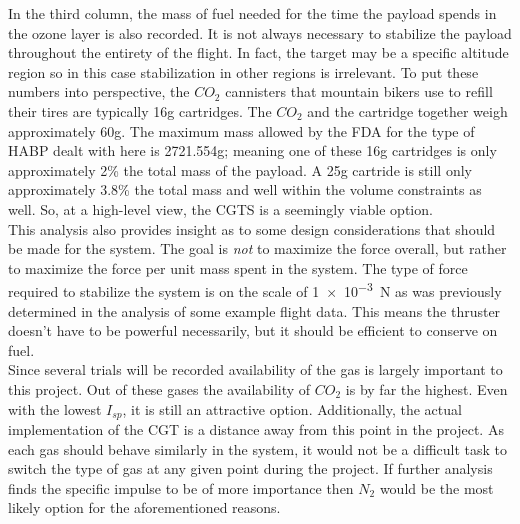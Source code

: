 In the third column, the mass of fuel needed for the time the payload spends in the ozone layer is also recorded. It is not always necessary to stabilize the payload throughout the entirety of the flight. In fact, the target may be a specific altitude region so in this case stabilization in other regions is irrelevant. To put these numbers into perspective, the $CO_2$ cannisters that mountain bikers use to refill their tires are typically 16g cartridges. The $CO_2$ and the cartridge together weigh approximately 60g. The maximum mass allowed by the FDA for the type of HABP dealt with here is 2721.554g; meaning one of these 16g cartridges is only approximately 2\% the total mass of the payload. A 25g cartride is still only approximately 3.8\% the total mass and well within the volume constraints as well. So, at a high-level view, the CGTS is a seemingly viable option.\\
This analysis also provides insight as to some design considerations that should be made for the system. The goal is \textit{not} to maximize the force overall, but rather to maximize the force per unit mass spent in the system. The type of force required to stabilize the system is on the scale of \SI{1e-3}{\newton} as was previously determined in the analysis of some example flight data. This means the thruster doesn't have to be powerful necessarily, but it should be efficient to conserve on fuel.\\
Since several trials will be recorded availability of the gas is largely important to this project. Out of these gases the availability of $CO_2$ is by far the highest. Even with the lowest $I_{sp}$, it is still an attractive option. Additionally, the actual implementation of the CGT is a distance away from this point in the project. As each gas should behave similarly in the system, it would not be a difficult task to switch the type of gas at any given point during the project. If further analysis finds the specific impulse to be of more importance then $N_2$ would be the most likely option for the aforementioned reasons. 
